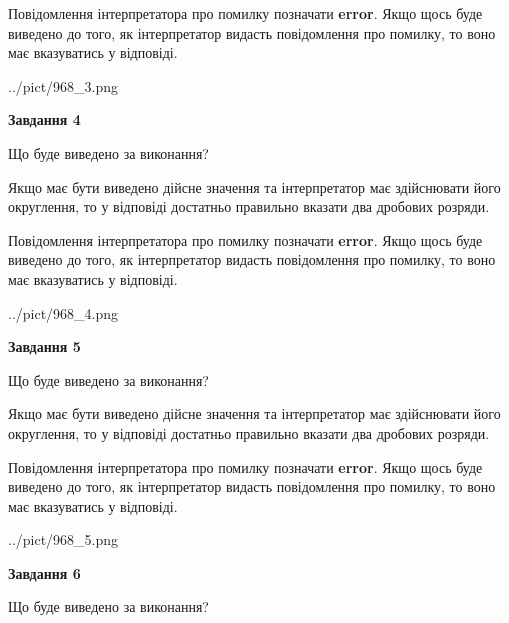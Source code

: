 \documentclass[12pt, ukrainian]{article}
\begin{document}
{\begin {Large}
Повідомлення інтерпретатора про помилку позначати \textbf{error}.
Якщо щось буде виведено до того, як інтерпретатор видасть повідомлення про помилку, 
то воно має вказуватись у відповіді. \par

\begin{center}
	{../pict/968_3.png}
\end{center}
\newpage

{\begin {center}\textbf{Завдання 4}\end {center}}\par
Що буде виведено за виконання? \par

Якщо має бути виведено дійсне значення та інтерпретатор має здійснювати його округлення, 
то у відповіді достатньо правильно вказати два дробових розряди.

Повідомлення інтерпретатора про помилку позначати \textbf{error}.
Якщо щось буде виведено до того, як інтерпретатор видасть повідомлення про помилку, 
то воно має вказуватись у відповіді. \par

\begin{center}
	{../pict/968_4.png}
\end{center}
\newpage

{\begin {center}\textbf{Завдання 5}\end {center}}\par
Що буде виведено за виконання? \par

Якщо має бути виведено дійсне значення та інтерпретатор має здійснювати його округлення, 
то у відповіді достатньо правильно вказати два дробових розряди.

Повідомлення інтерпретатора про помилку позначати \textbf{error}.
Якщо щось буде виведено до того, як інтерпретатор видасть повідомлення про помилку, 
то воно має вказуватись у відповіді. \par

\begin{center}
	{../pict/968_5.png}
\end{center}
\newpage

{\begin {center}\textbf{Завдання 6}\end {center}}\par
Що буде виведено за виконання? \par


\end{Large}}
\end{document}
